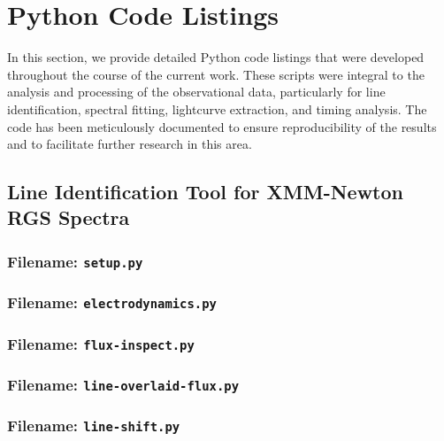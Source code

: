 \chapter{Python Code Listings} \label{appendix:code-listings}
	In this section, we provide detailed Python code listings that were developed throughout the course of the current work. These scripts were integral to the analysis and processing of the observational data, particularly for line identification, spectral fitting, lightcurve extraction, and timing analysis. The code has been meticulously documented to ensure reproducibility of the results and to facilitate further research in this area.
	
	\singlespacing
    \section{Line Identification Tool for XMM-Newton RGS Spectra}
		\subsection*{Filename: \texttt{setup.py}}
    	
    	    	
    	\subsection*{Filename: \texttt{electrodynamics.py}}
    	
    	
    	\subsection*{Filename: \texttt{flux-inspect.py}}
    	
    	
    	\subsection*{Filename: \texttt{line-overlaid-flux.py}}
    	
    	
    	\subsection*{Filename: \texttt{line-shift.py}}
    	
    	
